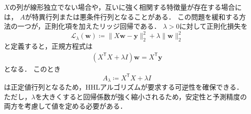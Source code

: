 $X$の列が線形独立でない場合や，互いに強く相関する特徴量が存在する場合には，
$A$が特異行列または悪条件行列となることがある．
この問題を緩和する方法の一つが，正則化項を加えたリッジ回帰である．
$\lambda>0$に対して正則化損失を
\begin{equation}
  \mathcal{L}_{\lambda}(\bm{w})
  \coloneq
  \|X\bm{w}-\bm{y}\|_2^2
  +\lambda\|\bm{w}\|_2^2
  \label{eq:ridge-loss}
\end{equation}
と定義すると，正規方程式は
\begin{align*}
  (X^{\mathsf{T}}X+\lambda I)\bm{w}
  =
  X^{\mathsf{T}}\bm{y}
\end{align*}
となる．
このとき
\begin{equation}
  A_{\lambda}
  \coloneq
  X^{\mathsf{T}}X+\lambda I
  \label{eq:regularized-regression-matrix}
\end{equation}
は正定値行列となるため，HHLアルゴリズムが要求する可逆性を確保できる．
ただし，$\lambda$を大きくすると回帰係数が強く縮小されるため，安定性と予測精度の両方を考慮して値を定める必要がある．
